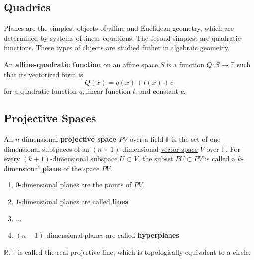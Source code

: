 \subsection{Quadrics}

  Planes are the simplest objects of affine and Euclidean geometry, which are determined by systems of linear equations. The second simplest are quadratic functions. These types of objects are studied futher in algebraic geometry. 

  \begin{definition}
    \label{def:affine-quadratic-function}
    An \textbf{affine-quadratic function} on an affine space $S$ is a function $Q: S \to \mathbb{F}$ such that its vectorized form is
    \begin{equation}
      Q(x) = q(x) + l(x) + c
    \end{equation}
    for a quadratic function $q$, linear function $l$, and constant $c$. 
  \end{definition}

\subsection{Projective Spaces}

  \begin{definition}
    \label{def:projective-space-pv}
    An $n$-dimensional \textbf{projective space $PV$} over a field $\mathbb{F}$ is the set of one-dimensional subspaces of an $(n+1)$-dimensional \hyperref[def:vector-space]{vector space} $V$ over $\mathbb{F}$. For every $(k+1)$-dimensional subspace $U \subset V$, the subset $PU \subset PV$ is called a $k$-dimensional \textbf{plane} of the space $PV$. 
    \begin{enumerate}
      \item $0$-dimensional planes are the points of $PV$. 
      \item $1$-dimensional planes are called \textbf{lines}
      \item ...
      \item $(n-1)$-dimensional planes are called \textbf{hyperplanes}
    \end{enumerate}
  \end{definition}

  \begin{definition}
    \label{def:the-real-projective-line}
    $\mathbb{RP}^1$ is called the real projective line, which is topologically equivalent to a circle. 
  \end{definition}

